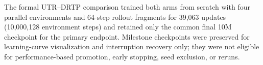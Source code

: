 The formal UTR--DRTP comparison trained both arms from scratch with four parallel environments and 64-step rollout fragments for 39,063 updates (10,000,128 environment steps) and retained only the common final 10M checkpoint for the primary endpoint. Milestone checkpoints were preserved for learning-curve visualization and interruption recovery only; they were not eligible for performance-based promotion, early stopping, seed exclusion, or reruns.